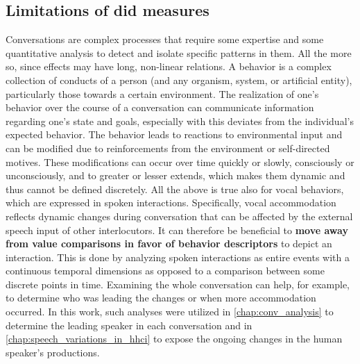 \subsection{Limitations of \acl{did} measures}
\label{subsec:limitations_of_did}




Conversations are complex processes that require some expertise and some quantitative analysis to detect and isolate specific patterns in them.
All the more so, since effects may have long, non-linear relations.
A behavior is a complex collection of conducts of a person (and any organism, system, or artificial entity), particularly those towards a certain environment.
The realization of one's behavior over the course of a conversation can communicate information regarding one's state and goals, especially with this deviates from the individual's expected behavior.
The behavior leads to reactions to environmental input and can be modified due to reinforcements from the environment or self-directed motives.
These modifications can occur over time quickly or slowly, consciously or unconsciously, and to greater or lesser extends, which makes them dynamic and thus cannot be defined discretely.
All the above is true also for vocal behaviors, which are expressed in spoken interactions.
Specifically, vocal accommodation reflects dynamic changes during conversation that can be affected by the external speech input of other interlocutors.
It can therefore be beneficial to \textbf{move away from value comparisons in favor of behavior descriptors} to depict an interaction.
This is done by analyzing spoken interactions as entire events with a continuous temporal dimensions as opposed to a comparison between some discrete points in time.
Examining the whole conversation can help, for example, to determine who was leading the changes or when more accommodation occurred.
In this work, such analyses were utilized in \cref{chap:conv_analysis} to determine the leading speaker in each conversation and in \cref{chap:speech_variations_in_hhci} to expose the ongoing changes in the human speaker's productions.


